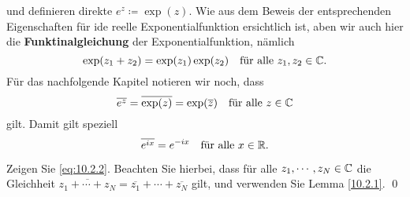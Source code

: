 und definieren direkte $ e^z \coloneqq \exp (z) $. Wie aus dem Beweis der entsprechenden Eigenschaften für ide reelle Exponentialfunktion ersichtlich ist, aben wir auch hier die \textbf{Funktinalgleichung} der Exponentialfunktion, nämlich
\[
	\exp (z_1 + z_2) = \exp (z_1) \exp (z_2) \quad \text{für alle } z_1, z_2 \in \mathbb{C} .
\]
Für das nachfolgende Kapitel notieren wir noch, dass
\begin{equation}
	\label{eq:10.2.1}
	\overline{e^z} = \overline{\exp (z)} = \exp (\overline{z} ) \quad \text{für alle } z \in \mathbb{C} 
\end{equation}
gilt. Damit gilt speziell
\begin{equation}
	\label{eq:10.2.2}
	\overline{e^{ix} } = e^{-ix} \quad \text{für alle } x \in \mathbb{R} .
\end{equation}

\begin{task}
	Zeigen Sie \eqref{eq:10.2.2}. Beachten Sie hierbei, dass für alle $ z_1, \dotsb, z_N \in \mathbb{C}  $ die Gleichheit $ \overline{z_1 + \dotsb + z_N} = \overline{z_1} + \dotsb + \overline{z_N}  $ gilt, und verwenden Sie Lemma \ref{10.2.1}. \qed
\end{task}

